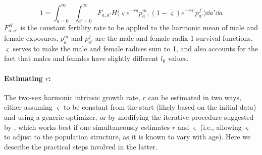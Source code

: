 \begin{equation}
\label{eq:lotkaH}
1 = \int _{a=0}^\infty \int _{a'=0}^\infty F_{a,a'} H\Big(\varsigma
e^{-ra}p_a^m, (1-\varsigma)e^{-ra'}p_{a'}^f\Big)\dd a' \dd a
\end{equation}
$F_{a,a'}^H$ is the constant fertility rate to be applied to the harmonic
mean of male and female exposures, $p_a^m$ and $p_{a'}^f$ are the male
and female radix-1 survival functions. $\varsigma$ serves to make the
male and female radices sum to 1, and also accounts for the fact that males and
females have slightly different $l_0$ values. 

\paragraph{Estimating $r$: } The two-sex harmonic intrinsic growth rate, $r$ can
be estimated in two ways, either assuming $\varsigma$ to be constant from the
start (likely based on the initial data) and using a generic optimizer, or by modifying the iterative procedure
suggested by \citet{coale1957new}, which works best if one simultaneously
estimates $r$ and $\varsigma$ (i.e., allowing $\varsigma$ to adjust to the
population structure, as it is known to vary with age). Here we describe
the practical steps involved in the latter.


